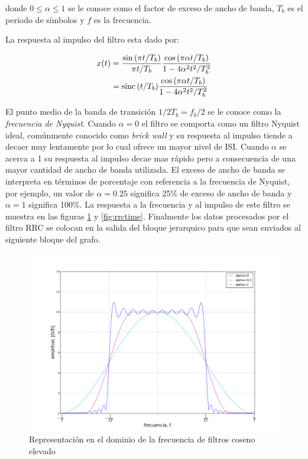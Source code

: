 donde $0 \leq \alpha \leq 1$ se le conoce como el factor de exceso de ancho de banda, $T_b$ es el
periodo de s\'imbolos y $f$ es la frecuencia. 

La respuesta al impulso del filtro esta dado por:

\begin{align}\label{eq:imptransfer}
x(t)&=\frac{\sin{(\pi t/T_b)}}{\pi t/T_b}\frac{\cos{(\pi\alpha t/T_b)}}{1-4\alpha^2t^2/T_b^2}
\nonumber \\ 
&=\operatorname{sinc}{(t/T_b)}\frac{\cos{(\pi \alpha t/T_b)}}{1-4\alpha^2t^2/T_b^2}
\end{align}

El punto medio de la banda de transici\'on $1/2T_b=f_b/2$ se le conoce como la \emph{frecuencia de
Nyquist}. Cuando $\alpha=0$ el filtro se comporta como un filtro Nyquist ideal, com\'unmente
conocido como \emph{brick wall} y su respuesta al impulso tiende a decaer muy lentamente por lo
cual ofrece un mayor nivel de ISI. Cuando $\alpha$ se acerca a 1 su respuesta al impulso decae mas
r\'apido pero a consecuencia de una mayor cantidad de ancho de banda utilizada. El exceso de ancho
de banda se interpreta en t\'erminos de porcentaje con referencia a la frecuencia de Nyquist, por
ejemplo, un valor de $\alpha=0.25$ significa 25\% de exceso de ancho de banda y $\alpha=1$
significa 100\%. La respuesta a la frecuencia y al impulso de este filtro se muestra en las figuras
\ref{fig:rrcfreq} y \ref{fig:rrctime}. Finalmente los datos procesados por el filtro RRC se colocan en la salida del bloque
jerarquico para que sean enviados al siguiente bloque del grafo. 


\begin{figure}[htp]
  \centering
  \includegraphics[width=5.9in]{figs/rrcfreq}
  \vspace{0.3in}
  \caption{Representaci\'on en el dominio de la frecuencia de filtros coseno elevado}
  \label{fig:rrcfreq}
\end{figure}

